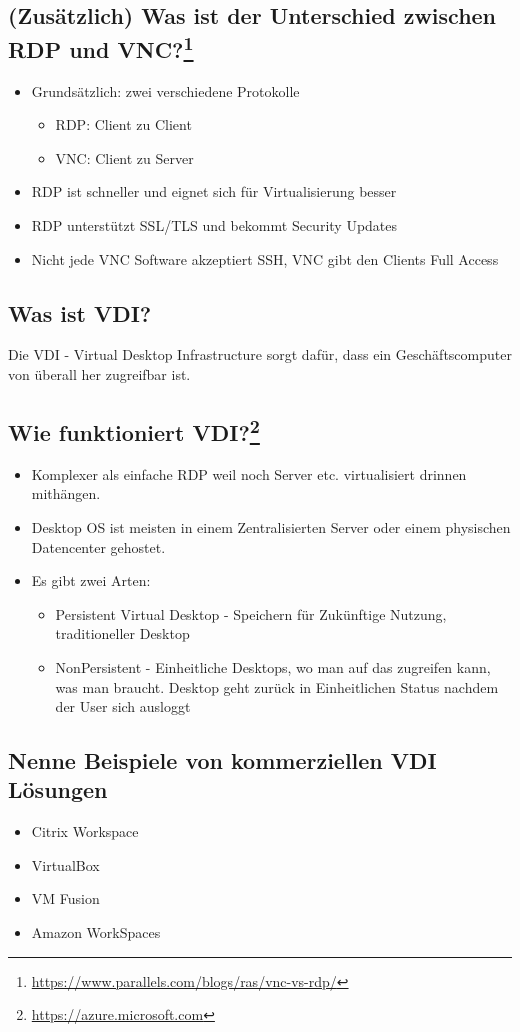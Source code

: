 \subsection*{(Zusätzlich) Was ist der Unterschied zwischen RDP und VNC?\footnote{\url{https://www.parallels.com/blogs/ras/vnc-vs-rdp/}}}
\begin{itemize}
    \item Grundsätzlich: zwei verschiedene Protokolle
    \begin{itemize}
        \item RDP: \flqq{}Client zu Client\frqq
        \item VNC: \flqq{}Client zu Server\frqq
    \end{itemize}
    \item RDP ist schneller und eignet sich für Virtualisierung besser
    \item RDP unterstützt SSL/TLS und bekommt Security Updates
    \item Nicht jede VNC Software akzeptiert SSH, VNC gibt den Clients \flqq{}Full Access\frqq
\end{itemize}

\subsection*{Was ist VDI?}
Die VDI - Virtual Desktop Infrastructure sorgt dafür, dass ein Geschäftscomputer von überall her zugreifbar ist.

\subsection*{Wie funktioniert VDI?\footnote{\url{https://azure.microsoft.com}}}
\begin{itemize}
    \item Komplexer als einfache RDP weil noch Server etc. virtualisiert drinnen mithängen.
    \item Desktop OS ist meisten in einem Zentralisierten Server oder einem physischen Datencenter gehostet.
    \item Es gibt zwei Arten:
    \begin{itemize}
        \item Persistent Virtual Desktop - Speichern für Zukünftige Nutzung, traditioneller Desktop
        \item NonPersistent - Einheitliche Desktops, wo man auf das zugreifen kann, was man braucht. Desktop geht zurück in Einheitlichen Status nachdem der User sich ausloggt
    \end{itemize}
\end{itemize}

\subsection*{Nenne Beispiele von kommerziellen VDI Lösungen}
\begin{itemize}
    \item Citrix Workspace
    \item VirtualBox
    \item VM Fusion
    \item Amazon WorkSpaces
\end{itemize}
